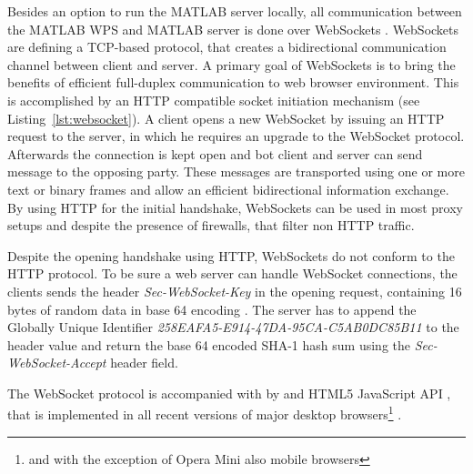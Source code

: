 		

		Besides an option to run the MATLAB server locally, all communication between the MATLAB WPS and MATLAB server is done over WebSockets \citep{ietf:rfc6455}. WebSockets are defining a TCP-based protocol, that creates a bidirectional communication channel between client and server. A primary goal of WebSockets is to bring the benefits of efficient full-duplex communication to web browser environment. This is accomplished by an HTTP compatible socket initiation mechanism (see Listing~\ref{lst:websocket}). A client opens a new WebSocket by issuing an HTTP request to the server, in which he requires an upgrade to the WebSocket protocol. Afterwards the connection is kept open and bot client and server can send message to the opposing party. These messages are transported using one or more text or binary frames and allow an efficient bidirectional information exchange. By using HTTP for the initial handshake, WebSockets can be used in most proxy setups and despite the presence of firewalls, that filter non HTTP traffic.

		Despite the opening handshake using HTTP, WebSockets do not conform to the HTTP protocol. To be sure a web server can handle WebSocket connections, the clients sends the header \emph{Sec-WebSocket-Key} in the opening request, containing 16 bytes of random data in base 64 encoding \citep{ietf:rfc4648}. The server has to append the Globally Unique Identifier \cite[GUID,][]{ietf:rfc4122} \emph{258EAFA5-E914-47DA-95CA-C5AB0DC85B11} to the header value and return the base 64 encoded SHA-1 \citep{NistFIPS1803} hash sum using the \emph{Sec-WebSocket-Accept} header field.

		The WebSocket protocol is accompanied with by and HTML5 JavaScript API \citep{w3c:ws}, that is implemented in all recent versions of major desktop browsers\footnote{and with the exception of Opera Mini also mobile browsers} \citep{caniuse}.

